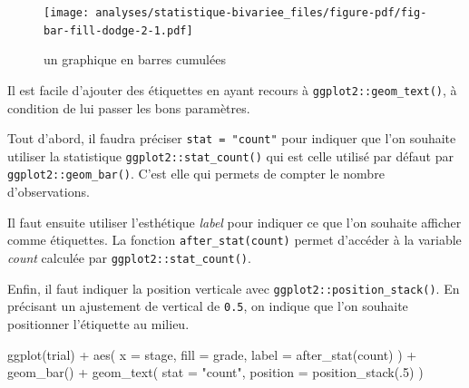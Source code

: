 \documentclass[
  letterpaper,
  DIV=11,
  numbers=noendperiod,
  oneside]{scrreprt}
\newenvironment{Shaded}{\begin{snugshade}}{\end{snugshade}}
\newcommand{\AttributeTok}[1]{\textcolor[rgb]{0.40,0.45,0.13}{#1}}
\newcommand{\DecValTok}[1]{\textcolor[rgb]{0.68,0.00,0.00}{#1}}
\newcommand{\FunctionTok}[1]{\textcolor[rgb]{0.28,0.35,0.67}{#1}}
\newcommand{\NormalTok}[1]{\textcolor[rgb]{0.00,0.23,0.31}{#1}}
\newcommand{\SpecialCharTok}[1]{\textcolor[rgb]{0.37,0.37,0.37}{#1}}
\newcommand{\StringTok}[1]{\textcolor[rgb]{0.13,0.47,0.30}{#1}}
\begin{document}
\begin{figure}[H]

{\centering \texttt{[image: analyses/statistique-bivariee\_files/figure-pdf/fig-bar-fill-dodge-2-1.pdf]}

}

\caption{\label{fig-bar-fill-dodge-2}un graphique en barres cumulées}

\end{figure}

\begin{tcolorbox}[enhanced jigsaw, colbacktitle=quarto-callout-tip-color!10!white, opacityback=0, toprule=.15mm, colback=white, coltitle=black, bottomtitle=1mm, toptitle=1mm, titlerule=0mm, rightrule=.15mm, title=\textcolor{quarto-callout-tip-color}{\faLightbulb}\hspace{0.5em}{Ajouter des étiquettes sur un diagramme en barres}, breakable, bottomrule=.15mm, opacitybacktitle=0.6, arc=.35mm, left=2mm, leftrule=.75mm, colframe=quarto-callout-tip-color-frame]

Il est facile d'ajouter des étiquettes en ayant recours à
\texttt{ggplot2::geom\_text()}, à condition de lui passer les bons
paramètres.

Tout d'abord, il faudra préciser \texttt{stat\ =\ "count"} pour indiquer
que l'on souhaite utiliser la statistique
\texttt{ggplot2::stat\_count()} qui est celle utilisé par défaut par
\texttt{ggplot2::geom\_bar()}. C'est elle qui permets de compter le
nombre d'observations.

Il faut ensuite utiliser l'esthétique \emph{label} pour indiquer ce que
l'on souhaite afficher comme étiquettes. La fonction
\texttt{after\_stat(count)} permet d'accéder à la variable \emph{count}
calculée par \texttt{ggplot2::stat\_count()}.

Enfin, il faut indiquer la position verticale avec
\texttt{ggplot2::position\_stack()}. En précisant un ajustement de
vertical de \texttt{0.5}, on indique que l'on souhaite positionner
l'étiquette au milieu.

\begin{Shaded}
\begin{Highlighting}[]
\FunctionTok{ggplot}\NormalTok{(trial) }\SpecialCharTok{+}
  \FunctionTok{aes}\NormalTok{(}
    \AttributeTok{x =}\NormalTok{ stage, }\AttributeTok{fill =}\NormalTok{ grade, }
    \AttributeTok{label =} \FunctionTok{after\_stat}\NormalTok{(count)}
\NormalTok{  ) }\SpecialCharTok{+}
  \FunctionTok{geom\_bar}\NormalTok{() }\SpecialCharTok{+}
  \FunctionTok{geom\_text}\NormalTok{(}
    \AttributeTok{stat =} \StringTok{"count"}\NormalTok{, }
    \AttributeTok{position =} \FunctionTok{position\_stack}\NormalTok{(.}\DecValTok{5}\NormalTok{)}
\NormalTok{  )}
\end{Highlighting}
\end{Shaded}


\end{tcolorbox}
\end{document}
